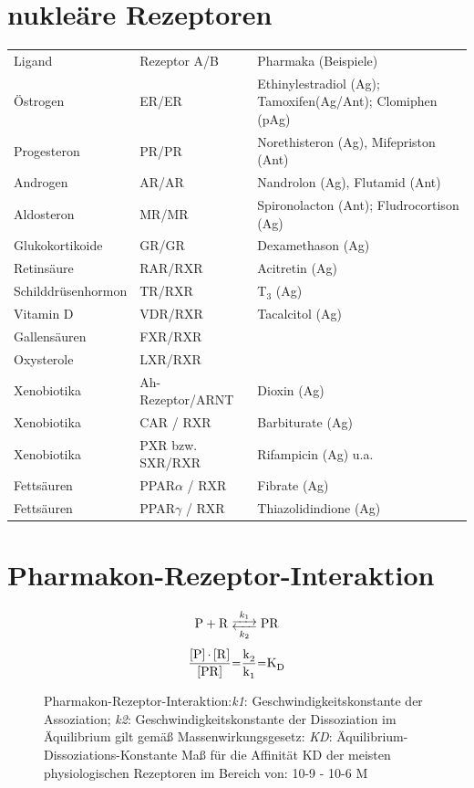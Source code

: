 \documentclass[10pt,a4paper]{report}
\newenvironment{reaction}{\begin{equation}}{\end{equation}}
\begin{document}
\section{nukleäre Rezeptoren}
\begin{tabularx}{\textwidth}{XXX}
Ligand&Rezeptor A/B&Pharmaka (Beispiele)\\
Östrogen&ER/ER&Ethinylestradiol (Ag); Tamoxifen(Ag/Ant); Clomiphen (pAg)\\
Progesteron&PR/PR&Norethisteron (Ag), Mifepriston (Ant)\\
Androgen&AR/AR&Nandrolon (Ag), Flutamid (Ant)\\
Aldosteron&MR/MR&Spironolacton (Ant); Fludrocortison (Ag)\\
Glukokortikoide&GR/GR&Dexamethason (Ag)\\
Retinsäure&RAR/RXR&Acitretin (Ag)\\		
Schilddrüsenhormon&TR/RXR&T$_3$ (Ag)\\
Vitamin D&VDR/RXR&Tacalcitol (Ag)\\
Gallensäuren&FXR/RXR&\\
Oxysterole&LXR/RXR&\\
Xenobiotika&Ah-Rezeptor/ARNT&Dioxin (Ag)\\
Xenobiotika&CAR / RXR&Barbiturate (Ag)\\
Xenobiotika&PXR bzw. SXR/RXR&Rifampicin (Ag) u.a.\\	
Fettsäuren&PPAR$\alpha$ / RXR&Fibrate (Ag)\\
Fettsäuren&PPAR$\gamma$ / RXR&Thiazolidindione (Ag)\\
\end{tabularx}
\section{Pharmakon-Rezeptor-Interaktion}
\begin{figure}[h]
\begin{reaction}
	\ce{P + R <-->[{k_1}][{k_2}] PR}
\end{reaction}	
\begin{reaction}
	\ce{\frac{[P] * [R]}{[PR]}=\frac{k_2}{k_1}=K_D}
\end{reaction}
\caption{Pharmakon-Rezeptor-Interaktion:\textit{k1}: Geschwindigkeitskonstante der Assoziation;
\textit{k2}: Geschwindigkeitskonstante der Dissoziation 
im Äquilibrium gilt gemäß Massenwirkungsgesetz:
\textit{KD}: Äquilibrium-Dissoziations-Konstante
       Maß für die Affinität
KD der meisten physiologischen Rezeptoren im Bereich von: 10-9 - 10-6 M}
\end{figure}
\end{document}
